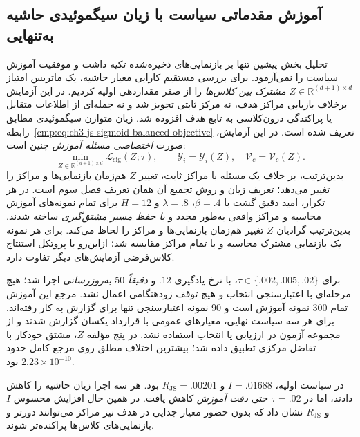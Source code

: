 \subsection{آموزش مقدماتی سیاست با زیان سیگموئیدی حاشیه به‌تنهایی}
\label{subsec:ch4-sigmoid-direct-training}
\label{subsec:ch4-margin-only-training}
تحلیل بخش پیشین تنها بر بازنمایی‌های ذخیره‌شده تکیه داشت و موفقیت آموزش سیاست را نمی‌آزمود. برای بررسی مستقیم کارایی معیار حاشیه، یک ماتریس امتیاز $Z\in\mathbb R^{(d+1)\times d}$ \emph{مشترک بین کلاس‌ها} را از صفر مقداردهی اولیه کردیم. در این آزمایش برخلاف بازیابی مراکز هدف، نه مرکز ثابتی تجویز شد و نه جمله‌ای از اطلاعات متقابل یا پراکندگی
درون‌کلاسی به تابع هدف افزوده شد.
زیان متوازن سیگموئیدی مطابق
رابطه~\eqref{cmp:eq:ch3-js-sigmoid-balanced-objective}
تعریف شده است. در این آزمایش، صورت
\emph{اختصاصی مسئله آموزش} چنین است:
\begin{equation}\label{eq:ch4-margin-only-objective}
\boxed{
\min_{Z\in\mathbb R^{(d+1)\times d}}
\mathcal L_{\mathrm{sig}}(Z;\tau),
\qquad
\mathscr Y_i=\mathscr Y_i(Z),\quad
\mathcal V_c=\mathcal V_c(Z).
}
\end{equation}
بدین‌ترتیب، بر خلاف یک مسئله با
مراکز ثابت، تغییر $Z$ هم‌زمان
بازنمایی‌ها و مراکز را تغییر می‌دهد؛
تعریف زیان و روش تجمیع آن همان
تعریف فصل سوم است.
در هر تکرار، امید دقیق گشت با $\beta=.4$، $\lambda=.8$ و $H=12$ برای تمام نمونه‌های آموزش محاسبه و مراکز واقعی به‌طور مجدد و \emph{با حفظ مسیر مشتق‌گیری} ساخته شدند. بدین‌ترتیب گرادیان $Z$ تغییر هم‌زمان بازنمایی‌ها و مراکز را لحاظ می‌کند. برای هر نمونه یک بازنمایی مشترک محاسبه و با تمام مراکز مقایسه شد؛ ازاین‌رو با پروتکل استنتاج کلاس‌فرضی آزمایش‌های دیگر تفاوت دارد.

برای $\tau\in\{.002,.005,.02\}$،  با نرخ یادگیری $.12$ و \emph{دقیقاً $50$ به‌روزرسانی} اجرا شد؛ هیچ مرحله‌ای با اعتبارسنجی انتخاب و هیچ توقف زودهنگامی اعمال نشد. مرجع این آموزش تمام $300$ نمونه آموزش است و $90$ نمونه اعتبارسنجی تنها برای گزارش به کار رفته‌اند. برای هر سه سیاست نهایی، معیارهای عمومی با قرارداد یکسان گزارش شدند و از مجموعه آزمون در ارزیابی یا انتخاب استفاده نشد. در پنج مؤلفه $Z$، مشتق خودکار با تفاضل مرکزی تطبیق داده شد؛ بیشترین اختلاف مطلق روی مرجع کامل حدود $2.23\times10^{-10}$ بود.


در سیاست اولیه، $I=.01688$ و $R_{\mathrm{JS}}=.00201$ بود. هر سه اجرا زیان حاشیه را کاهش دادند، اما در $\tau=.02$ حتی \emph{دقت آموزش} کاهش یافت. در همین حال افزایش محسوس $I$ و $R_{\mathrm{JS}}$ نشان داد که بدون حضور معیار جدایی در هدف نیز مراکز می‌توانند دورتر و بازنمایی‌های کلاس‌ها پراکنده‌تر شوند.


